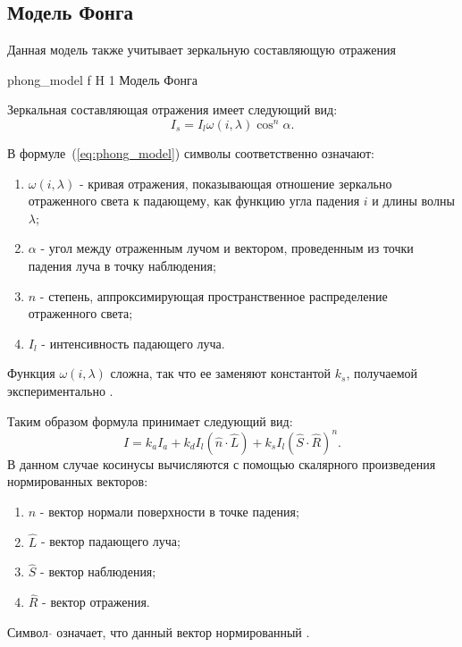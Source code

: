 \subsection{Модель Фонга}
Данная модель также учитывает зеркальную составляющую отражения


{phong_model} %
{f} %
{H} %
{1\textwidth} %
{Модель Фонга} %



Зеркальная составляющая отражения имеет следующий вид:
\begin{equation} 
	I_s = I_l\omega(i,\lambda)\cos^n \alpha.
	\label{eq:phong_model}
\end{equation}

В формуле~(\ref{eq:phong_model}) символы соответственно означают:
\begin{enumerate} 
	\item $\omega(i,\lambda)$ - кривая отражения, показывающая отношение зеркально отраженного света к падающему, как функцию угла падения $i$ и длины волны $\lambda$;
	\item $\alpha$ - угол между отраженным лучом и вектором, проведенным из точки падения луча в точку наблюдения;
	\item $n$ - степень, аппроксимирующая пространственное распределение отраженного света;
	\item $I_l$ - интенсивность падающего луча.
\end{enumerate}
Функция $\omega(i,\lambda)$ сложна, так что ее заменяют константой $k_s$, получаемой экспериментально \cite{Rodgers}.


Таким образом формула принимает следующий вид:
\begin{equation} 
	I = k_aI_a + k_dI_{l}(\hat{n} \cdot \hat{L}) + k_s  I_{l}(\hat{S} \cdot \hat{R})^n.
\end{equation}
В данном случае косинусы вычисляются с помощью скалярного произведения нормированных векторов:
\begin{enumerate}
	\item $\hat{n}$ - вектор нормали поверхности в точке падения;
	\item $\hat{L}$ - вектор падающего луча;
	\item $\hat{S}$ - вектор наблюдения;
	\item $\hat{R}$ - вектор отражения.
\end{enumerate}
Символ $\hat{}$ означает, что данный вектор нормированный \cite{Rodgers}.











